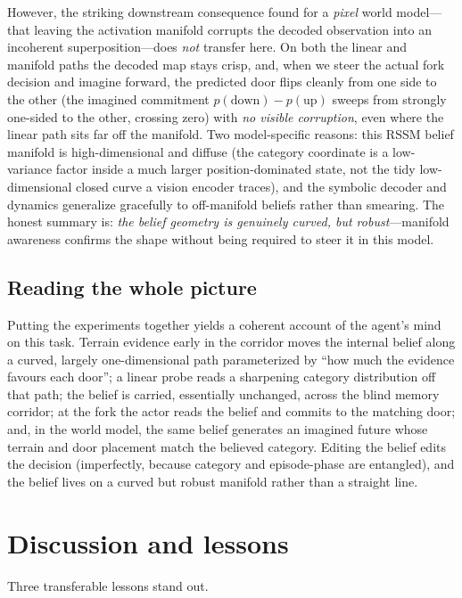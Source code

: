 \documentclass[11pt]{article}
\begin{document}
However, the striking downstream consequence found for a \emph{pixel} world
model---that leaving the activation manifold corrupts the decoded observation
into an incoherent superposition---does \emph{not} transfer here. On both the
linear and manifold paths the decoded map stays crisp, and, when we steer the
actual fork decision and imagine forward, the predicted door flips cleanly from
one side to the other (the imagined commitment
$p(\text{down})-p(\text{up})$ sweeps from strongly one-sided to the other,
crossing zero) with \emph{no visible corruption}, even where the linear path sits
far off the manifold. Two model-specific reasons: this RSSM belief manifold is
high-dimensional and diffuse (the category coordinate is a low-variance factor
inside a much larger position-dominated state, not the tidy low-dimensional
closed curve a vision encoder traces), and the symbolic decoder and dynamics
generalize gracefully to off-manifold beliefs rather than smearing. The honest
summary is: \emph{the belief geometry is genuinely curved, but robust}---manifold
awareness confirms the shape without being required to steer it in this model.

\subsection{Reading the whole picture}
Putting the experiments together yields a coherent account of the agent's mind on
this task. Terrain evidence early in the corridor moves the internal belief along
a curved, largely one-dimensional path parameterized by ``how much the evidence
favours each door''; a linear probe reads a sharpening category distribution off
that path; the belief is carried, essentially unchanged, across the blind memory
corridor; at the fork the actor reads the belief and commits to the matching
door; and, in the world model, the same belief generates an imagined future whose
terrain and door placement match the believed category. Editing the belief edits
the decision (imperfectly, because category and episode-phase are entangled), and
the belief lives on a curved but robust manifold rather than a straight line.

\section{Discussion and lessons}
\label{sec:discussion}
Three transferable lessons stand out.
\end{document}
